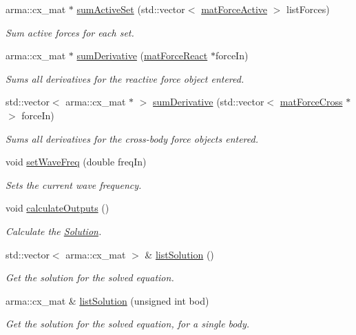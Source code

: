 \begin{DoxyCompactItemize}
arma\-::cx\-\_\-mat $\ast$ \hyperlink{classosea_1_1ofreq_1_1_motion_solver_a3cb1ad32fc63451422af408f7c07fda6}{sum\-Active\-Set} (std\-::vector$<$ \hyperlink{classosea_1_1ofreq_1_1mat_force_active}{mat\-Force\-Active} $>$ list\-Forces)
\begin{DoxyCompactList}\small\item\em Sum active forces for each set. \end{DoxyCompactList}\item 
arma\-::cx\-\_\-mat $\ast$ \hyperlink{classosea_1_1ofreq_1_1_motion_solver_abe3c2cac5c822e59db5914bf5450d514}{sum\-Derivative} (\hyperlink{classosea_1_1ofreq_1_1mat_force_react}{mat\-Force\-React} $\ast$force\-In)
\begin{DoxyCompactList}\small\item\em Sums all derivatives for the reactive force object entered. \end{DoxyCompactList}\item 
std\-::vector$<$ arma\-::cx\-\_\-mat $\ast$ $>$ \hyperlink{classosea_1_1ofreq_1_1_motion_solver_a7e5465b12b38dd33a57b04b5f07aa21d}{sum\-Derivative} (std\-::vector$<$ \hyperlink{classosea_1_1ofreq_1_1mat_force_cross}{mat\-Force\-Cross} $\ast$ $>$ force\-In)
\begin{DoxyCompactList}\small\item\em Sums all derivatives for the cross-\/body force objects entered. \end{DoxyCompactList}\item 
void \hyperlink{classosea_1_1ofreq_1_1_motion_solver_a5deee421d26ef9729e0a870fd48b4403}{set\-Wave\-Freq} (double freq\-In)
\begin{DoxyCompactList}\small\item\em Sets the current wave frequency. \end{DoxyCompactList}\item 
void \hyperlink{classosea_1_1ofreq_1_1_motion_solver_a28190e2b9c937f8889ba37db35069c52}{calculate\-Outputs} ()
\begin{DoxyCompactList}\small\item\em Calculate the \hyperlink{classosea_1_1ofreq_1_1_solution}{Solution}. \end{DoxyCompactList}\item 
std\-::vector$<$ arma\-::cx\-\_\-mat $>$ \& \hyperlink{classosea_1_1ofreq_1_1_motion_solver_a8391c0f67d1d711294f2e6f44363b9bf}{list\-Solution} ()
\begin{DoxyCompactList}\small\item\em Get the solution for the solved equation. \end{DoxyCompactList}\item 
arma\-::cx\-\_\-mat \& \hyperlink{classosea_1_1ofreq_1_1_motion_solver_a20a5c24bd163adb5654eceee6030f898}{list\-Solution} (unsigned int bod)
\begin{DoxyCompactList}\small\item\em Get the solution for the solved equation, for a single body. \end{DoxyCompactList}\end{DoxyCompactItemize}
